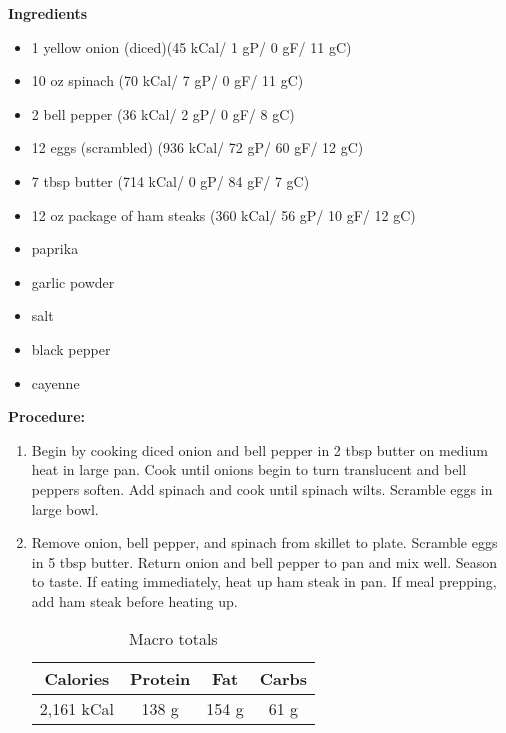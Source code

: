 \begin{multicols}{2}
\textbf{Ingredients}
\begin{itemize}
\item 1 yellow onion (diced)\quad (45 kCal/ 1 gP/ 0 gF/ 11 gC)
\item 10 oz spinach \quad (70 kCal/ 7 gP/ 0 gF/ 11 gC)
\item 2 bell pepper \quad (36 kCal/ 2 gP/ 0 gF/ 8 gC)
\item 12 eggs (scrambled)  \quad (936 kCal/ 72 gP/ 60 gF/ 12 gC)
\item 7 tbsp butter \quad (714 kCal/ 0 gP/ 84 gF/ 7 gC)
\item 12 oz package of ham steaks \quad (360 kCal/ 56 gP/ 10 gF/ 12 gC)
\item paprika 
\item garlic powder 
\item salt
\item black pepper
\item cayenne



\end{itemize}


\columnbreak
\textbf{Procedure:}


\begin{enumerate}
\item Begin by cooking diced onion and bell pepper in 2 tbsp butter on medium heat in large pan. Cook until onions begin to turn translucent and bell peppers soften. Add spinach and cook until spinach wilts. Scramble eggs in large bowl. 


\item Remove onion, bell pepper, and spinach from skillet to plate. Scramble eggs in 5 tbsp butter. Return onion and bell pepper to pan and mix well. Season to taste. If eating immediately, heat up ham steak in pan. If meal prepping, add ham steak before heating up. 

\begin{table}[H]
  \centering
    \caption{Macro totals}
    \label{tab:table1}
    \begin{tabular}{c|c|c|c} %
      \textbf{Calories} & \textbf{Protein} & \textbf{Fat} & \textbf{Carbs}\\
      \hline
      2,161 kCal & 138 g & 154 g & 61 g\\
    \end{tabular}
\end{table}
 
\end{enumerate}
\end{multicols}



